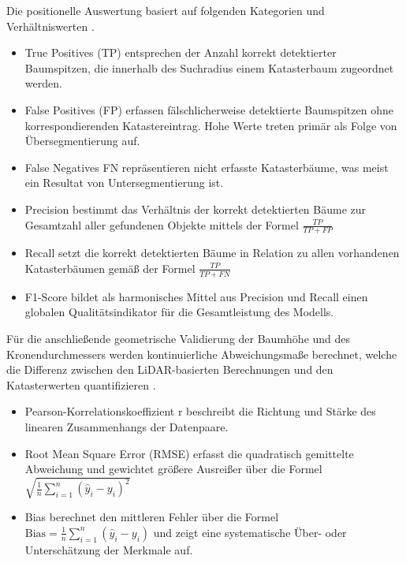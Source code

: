 Die positionelle Auswertung basiert auf folgenden Kategorien und Verhältniswerten \cite{zhangIndividualTreeSegmentation2024}.
\begin{itemize}
    \item True Positives (\ac{TP}) entsprechen der Anzahl korrekt detektierter Baumspitzen, die innerhalb des Suchradius einem Katasterbaum zugeordnet werden.
    \item False Positives (\ac{FP}) erfassen fälschlicherweise detektierte Baumspitzen ohne korrespondierenden Katastereintrag. Hohe Werte treten primär als Folge von Übersegmentierung auf.
    \item False Negatives \ac{FN} repräsentieren nicht erfasste Katasterbäume, was meist ein Resultat von Untersegmentierung ist.
    \item Precision bestimmt das Verhältnis der korrekt detektierten Bäume zur Gesamtzahl aller gefundenen Objekte mittels der Formel $\frac{TP}{TP + FP}$
    \item Recall setzt die korrekt detektierten Bäume in Relation zu allen vorhandenen Katasterbäumen gemäß der Formel $\frac{TP}{TP + FN}$
    \item F1-Score bildet als harmonisches Mittel aus Precision und Recall einen globalen Qualitätsindikator für die Gesamtleistung des Modells.
\end{itemize}

Für die anschließende geometrische Validierung der Baumhöhe und des Kronendurchmessers werden kontinuierliche Abweichungsmaße berechnet, welche die Differenz zwischen den LiDAR-basierten Berechnungen und den Katasterwerten quantifizieren \cite{munzingerMappingUrbanForest2022} \cite{marcelloPerformanceIndividualTree2024b}.
\begin{itemize}
    \item Pearson-Korrelationskoeffizient r beschreibt die Richtung und Stärke des linearen Zusammenhangs der Datenpaare.
    \item Root Mean Square Error (\ac{RMSE}) erfasst die quadratisch gemittelte Abweichung und gewichtet größere Ausreißer über die Formel $\sqrt{\frac{1}{n} \sum_{i=1}^{n} (\hat{y}_i - y_i)^2}$
    \item Bias berechnet den mittleren Fehler über die Formel $\text{Bias} = \frac{1}{n} \sum_{i=1}^{n} (\hat{y}_i - y_i)$ und zeigt eine systematische Über- oder Unterschätzung der Merkmale auf.
\end{itemize}
